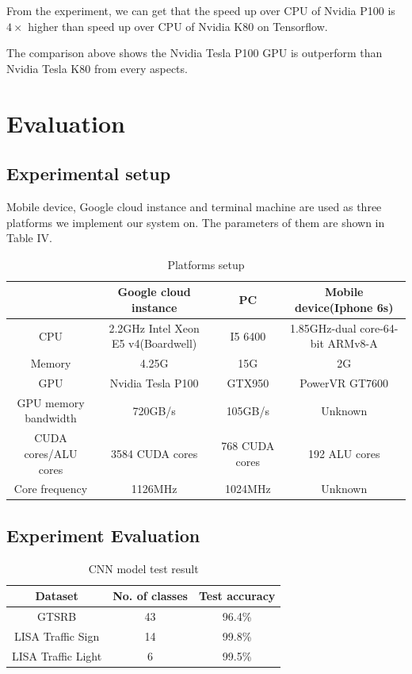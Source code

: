 \documentclass[conference]{IEEEtran}
\begin{document}
From the experiment, we can get that the speed up over CPU of Nvidia P100 is $4 \times$ higher than speed up over CPU of Nvidia K80 on Tensorflow. 

The comparison above shows the Nvidia Tesla P100 GPU is outperform than Nvidia Tesla K80 from every aspects. 

\section{Evaluation}

\subsection{Experimental setup}

Mobile device, Google cloud instance and terminal machine are used as three platforms we implement our system on. The parameters of them are shown in Table IV.  


\begin{table}
\caption{Platforms setup}
\centering
\begin{tabular}{|c|c|c|c|}
\hline
\textbf{} & \textbf{Google cloud instance }&\textbf{ PC }&
\textbf{Mobile device(Iphone 6s)}\\
\hline
CPU & 2.2GHz Intel Xeon E5 v4(Boardwell) & I5 6400 & 1.85GHz-dual core-64-bit ARMv8-A \\
\hline
Memory & 4.25G & 15G & 2G\\
\hline
GPU & Nvidia Tesla P100   & GTX950 & PowerVR GT7600 \\
\hline
GPU memory bandwidth & 720GB/s & 105GB/s & Unknown \\ 
\hline
CUDA cores/ALU cores & 3584 CUDA cores & 768 CUDA cores & 192 ALU cores \\
\hline
Core frequency & 1126MHz & 1024MHz & Unknown \\
\hline
\end{tabular}
\end{table}


\subsection{Experiment Evaluation}

\begin{table}[H]
\caption{CNN model test result}
\begin{center}
\begin{tabular}{|c|c|c|}
\hline
\textbf{Dataset} & \textbf{No. of classes}& \textbf{Test accuracy} \\
\hline
GTSRB & 43 & 96.4\% \\
\hline
LISA Traffic Sign & 14 & 99.8\% \\
\hline
LISA Traffic Light& 6 & 99.5\% \\
\hline
\end{tabular}
\label{tab3}
\end{center}
\end{table}
\end{document}
